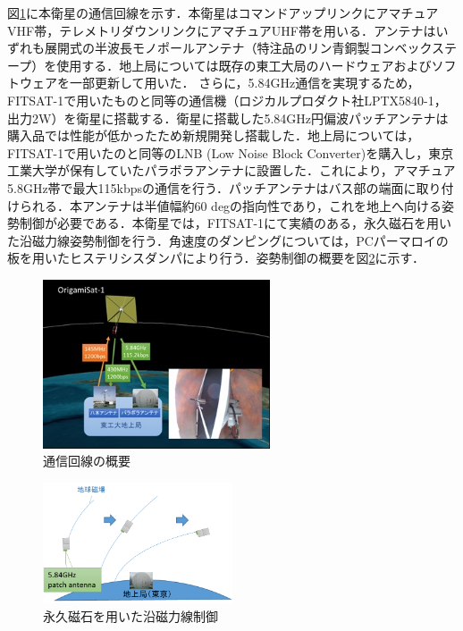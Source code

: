図\ref{2-3-4}に本衛星の通信回線を示す．本衛星はコマンドアップリンクにアマチュアVHF帯，テレメトリダウンリンクにアマチュアUHF帯を用いる．アンテナはいずれも展開式の半波長モノポールアンテナ（特注品のリン青銅製コンベックステープ）を使用する．地上局については既存の東工大局のハードウェアおよびソフトウェアを一部更新して用いた．
さらに，5.84GHz通信を実現するため，FITSAT-1で用いたものと同等の通信機（ロジカルプロダクト社LPTX5840-1，出力2W）を衛星に搭載する．衛星に搭載した5.84GHz円偏波パッチアンテナは購入品では性能が低かったため新規開発し搭載した．地上局については，FITSAT-1で用いたのと同等のLNB (Low Noise Block Converter)を購入し，東京工業大学が保有していたパラボラアンテナに設置した．これにより，アマチュア5.8GHz帯で最大115kbpsの通信を行う．パッチアンテナはバス部の端面に取り付けられる．本アンテナは半値幅約60 degの指向性であり，これを地上へ向ける姿勢制御が必要である．本衛星では，FITSAT-1にて実績のある，永久磁石を用いた沿磁力線姿勢制御を行う．角速度のダンピングについては，PCパーマロイの板を用いたヒステリシスダンパにより行う．姿勢制御の概要を図\ref{2-3-5}に示す．
\begin{figure}[H]
	\centering
	\includegraphics[width=0.6\textwidth]{02/fig/2-3-4.jpg}
	\caption{通信回線の概要}
	\label{2-3-4}
\end{figure}
\begin{figure}[H]
	\centering
	\includegraphics[width=0.5\textwidth]{02/fig/2-3-5.png}
	\caption{永久磁石を用いた沿磁力線制御}
	\label{2-3-5}
\end{figure}

